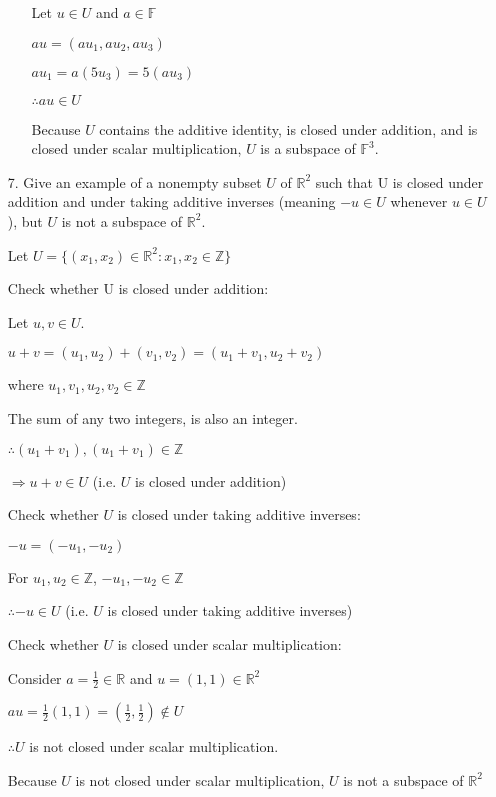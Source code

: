\documentclass{article}
\begin{document}
\begin{enumerate}[nolistsep]
\begin{enumerate}[nolistsep]
			Let $u \in U$ and $a \in \mathbb{F}$
			
			$au = (au_1, au_2, au_3)$
			
			$au_1 = a(5u_3) = 5(au_3)$
			
			$\therefore au \in U$
			
			Because $U$ contains the additive identity, is closed under addition, and is closed under scalar multiplication, $U$ is a subspace of $\mathbb{F}^3$.
			
		\end{enumerate}
		
		\item[7.] Give an example of a nonempty subset $U$ of $\mathbb{R}^2$ such that U is closed under addition and under taking additive inverses (meaning $-u \in U$ whenever $u \in U$), but $U$ is not a subspace of $\mathbb{R}^2$.
		
		Let $U = \{(x_1, x_2) \in \mathbb{R}^2 : x_1, x_2 \in \mathbb{Z}\}$
		
		Check whether U is closed under addition:
		
		Let $u, v \in U$.
		
		$u + v = (u_1, u_2) + (v_1, v_2) = (u_1 + v_1, u_2 + v_2)$
		
		where $u_1, v_1, u_2, v_2 \in \mathbb{Z}$
		
		The sum of any two integers, is also an integer. 
		
		$\therefore (u_1 + v_1), (u_1 + v_1) \in \mathbb{Z}$
		
		$\Rightarrow u + v \in U$ (i.e. $U$ is closed under addition)
		
		Check whether $U$ is closed under taking additive inverses:
		
		$-u = (-u_1, -u_2)$
		
		For $u_1, u_2 \in \mathbb{Z}$, $-u_1, -u_2 \in \mathbb{Z}$
		
		$\therefore -u \in U$ (i.e. $U$ is closed under taking additive inverses)
		
		Check whether $U$ is closed under scalar multiplication:
		
		Consider $a = \frac{1}{2} \in \mathbb{R}$ and $u = (1, 1) \in \mathbb{R}^2$
		
		$au = \frac{1}{2}(1, 1) = (\frac{1}{2}, \frac{1}{2}) \not\in U$
		
		$\therefore U$ is not closed under scalar multiplication.
		
		Because $U$ is not closed under scalar multiplication, $U$ is not a subspace of $\mathbb{R}^2$
		

\end{enumerate}
\end{document}
